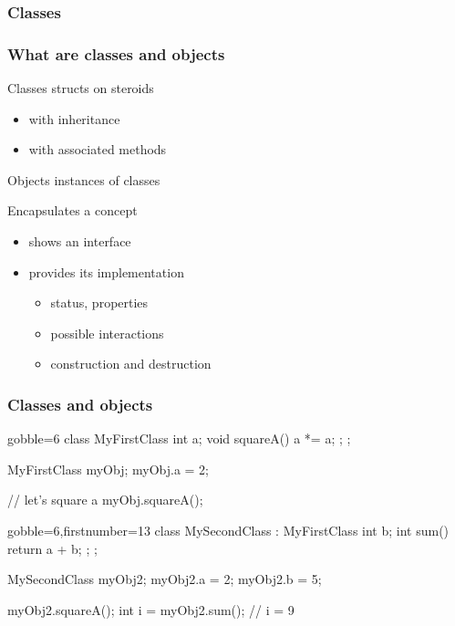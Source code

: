 \subsubsection{Classes}

\begin{frame}[fragile]
  \frametitle{What are classes and objects}
  \begin{block}{Classes}
    structs on steroids
    \begin{itemize}
    \item with inheritance
    \item with associated methods
    \end{itemize}
  \end{block}
  \begin{block}{Objects}
    instances of classes
  \end{block}
  \begin{block}{Encapsulates a concept}
    \begin{itemize}
    \item shows an interface
    \item provides its implementation
      \begin{itemize}
      \item status, properties
      \item possible interactions
      \item construction and destruction
      \end{itemize}    
    \end{itemize}    
  \end{block}
\end{frame}


\begin{frame}[fragile]
  \frametitle{Classes and objects}
  \begin{multicols}{2}
    \begin{cppcode*}{gobble=6}
      class MyFirstClass {
        int a;
        void squareA() {
          a *= a;
        };
      };

      MyFirstClass myObj;
      myObj.a = 2;

      // let's square a
      myObj.squareA();
    \end{cppcode*}
    \columnbreak
    \pause
    \begin{cppcode*}{gobble=6,firstnumber=13}
      class MySecondClass :
      MyFirstClass {
        int b;
        int sum() { return a + b; };
      };

      MySecondClass myObj2;
      myObj2.a = 2;
      myObj2.b = 5;

      myObj2.squareA();
      int i = myObj2.sum();
      // i = 9
    \end{cppcode*}
  \end{multicols}
\end{frame}


